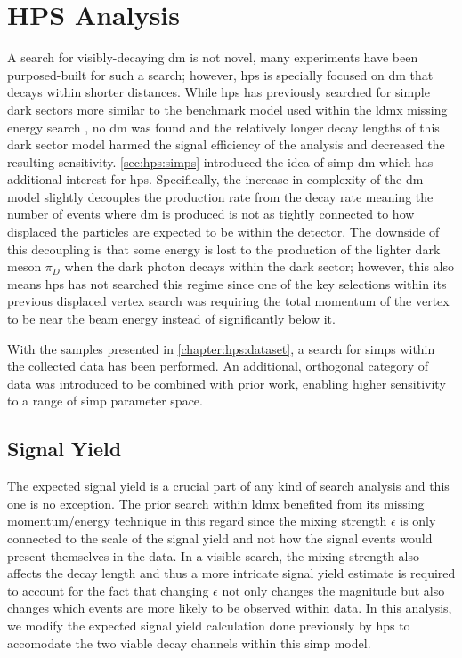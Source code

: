 \chapter{HPS Analysis}
\label{chapter:hps:analysis}

A search for visibly-decaying \ac{dm} is not novel, many experiments have been purposed-built
for such a search; however, \ac{hps} is specially focused on \ac{dm} that decays
within shorter distances.
While \ac{hps} has previously searched for simple dark sectors
more similar to the benchmark model used within the \ac{ldmx} missing energy search \cite{hps-2016-displaced-vtx},
no \ac{dm} was found and the relatively longer decay lengths of this dark sector model
harmed the signal efficiency of the analysis and decreased the resulting sensitivity.
\cref{sec:hps:simps} introduced the idea of \ac{simp} \ac{dm} which has additional
interest for \ac{hps}.
Specifically, the increase in complexity of the \ac{dm} model slightly decouples the production
rate from the decay rate meaning the number of events where \ac{dm} is produced is not as tightly
connected to how displaced the particles are expected to be within the detector.
The downside of this decoupling is that some energy is lost to the production of the lighter
dark meson $\pi_D$ when the dark photon decays within the dark sector; however,
this also means \ac{hps} has not searched this regime since one of the key selections within
its previous displaced vertex search was requiring the total momentum of the vertex to be
near the beam energy instead of significantly below it.

With the samples presented in \cref{chapter:hps:dataset}, a search for \acp{simp} within the collected
data has been performed.
An additional, orthogonal category of data was introduced to be combined with prior work,
enabling higher sensitivity to a range of \ac{simp} parameter space.

\section{Signal Yield}
\label{sec:hps:signal-yield}

The expected signal yield is a crucial part of any kind of search analysis
and this one is no exception.
The prior search within \ac{ldmx} benefited from its missing momentum/energy technique
in this regard since the mixing strength $\epsilon$ is only connected to the scale of the signal
yield and not how the signal events would present themselves in the data.
In a visible search, the mixing strength also affects the decay length and thus a more intricate
signal yield estimate is required to account for the fact that changing $\epsilon$ not only changes
the magnitude but also changes which events are more likely to be observed within data.
In this analysis, we modify the expected signal yield calculation done previously by \ac{hps}
\cite{hps-2016-displaced-vtx} to accomodate the two viable decay channels within this \ac{simp} model.

